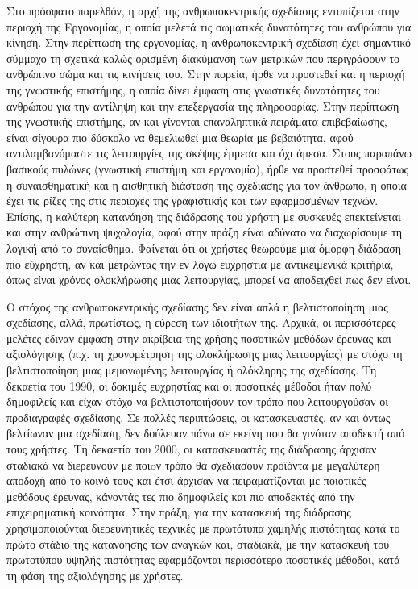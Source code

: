 \documentclass[
]{article}
\begin{document}
Στο πρόσφατο παρελθόν, η αρχή της ανθρωποκεντρικής σχεδίασης εντοπίζεται
στην περιοχή της Εργονομίας, η οποία μελετά τις σωματικές δυνατότητες
του ανθρώπου για κίνηση. Στην περίπτωση της εργονομίας, η
ανθρωποκεντρική σχεδίαση έχει σημαντικό σύμμαχο τη σχετικά καλώς
ορισμένη διακύμανση των μετρικών που περιγράφουν το ανθρώπινο σώμα και
τις κινήσεις του. Στην πορεία, ήρθε να προστεθεί και η περιοχή της
γνωστικής επιστήμης, η οποία δίνει έμφαση στις γνωστικές δυνατότητες του
ανθρώπου για την αντίληψη και την επεξεργασία της πληροφορίας. Στην
περίπτωση της γνωστικής επιστήμης, αν και γίνονται επαναληπτικά
πειράματα επιβεβαίωσης, είναι σίγουρα πιο δύσκολο να θεμελιωθεί μια
θεωρία με βεβαιότητα, αφού αντιλαμβανόμαστε τις λειτουργίες της σκέψης
έμμεσα και όχι άμεσα. Στους παραπάνω βασικούς πυλώνες (γνωστική επιστήμη
και εργονομία), ήρθε να προστεθεί προσφάτως η συναισθηματική και η
αισθητική διάσταση της σχεδίασης για τον άνθρωπο, η οποία έχει τις ρίζες
της στις περιοχές της γραφιστικής και των εφαρμοσμένων τεχνών. Επίσης, η
καλύτερη κατανόηση της διάδρασης του χρήστη με συσκευές επεκτείνεται και
στην ανθρώπινη ψυχολογία, αφού στην πράξη είναι αδύνατο να διαχωρίσουμε
τη λογική από το συναίσθημα. Φαίνεται ότι οι χρήστες θεωρούμε μια όμορφη
διάδραση πιο εύχρηστη, αν και μετρώντας την εν λόγω ευχρηστία με
αντικειμενικά κριτήρια, όπως είναι χρόνος ολοκλήρωσης μιας λειτουργίας,
μπορεί να αποδειχθεί πως δεν είναι.

Ο στόχος της ανθρωποκεντρικής σχεδίασης δεν είναι απλά η βελτιστοποίηση
μιας σχεδίασης, αλλά, πρωτίστως, η εύρεση των ιδιοτήτων της. Αρχικά, οι
περισσότερες μελέτες έδιναν έμφαση στην ακρίβεια της χρήσης ποσοτικών
μεθόδων έρευνας και αξιολόγησης (π.χ. τη χρονομέτρηση της ολοκλήρωσης
μιας λειτουργίας) με στόχο τη βελτιστοποίηση μιας μεμονωμένης
λειτουργίας ή ολόκληρης της σχεδίασης. Τη δεκαετία του 1990, οι δοκιμές
ευχρηστίας και οι ποσοτικές μέθοδοι ήταν πολύ δημοφιλείς και είχαν στόχο
να βελτιστοποιήσουν τον τρόπο που λειτουργούσαν οι προδιαγραφές
σχεδίασης. Σε πολλές περιπτώσεις, οι κατασκευαστές, αν και όντως
βελτίωναν μια σχεδίαση, δεν δούλευαν πάνω σε εκείνη που θα γινόταν
αποδεκτή από τους χρήστες. Τη δεκαετία του 2000, οι κατασκευαστές της
διάδρασης άρχισαν σταδιακά να διερευνούν με ποιoν τρόπο θα σχεδιάσουν
προϊόντα με μεγαλύτερη αποδοχή από το κοινό τους και έτσι άρχισαν να
πειραματίζονται με ποιοτικές μεθόδους έρευνας, κάνοντάς τες πιο
δημοφιλείς και πιο αποδεκτές από την επιχειρηματική κοινότητα. Στην
πράξη, για την κατασκευή της διάδρασης χρησιμοποιούνται διερευνητικές
τεχνικές με πρωτότυπα χαμηλής πιστότητας κατά το πρώτο στάδιο της
κατανόησης των αναγκών και, σταδιακά, με την κατασκευή του πρωτοτύπου
υψηλής πιστότητας εφαρμόζονται περισσότερο ποσοτικές μέθοδοι, κατά τη
φάση της αξιολόγησης με χρήστες.
\end{document}

